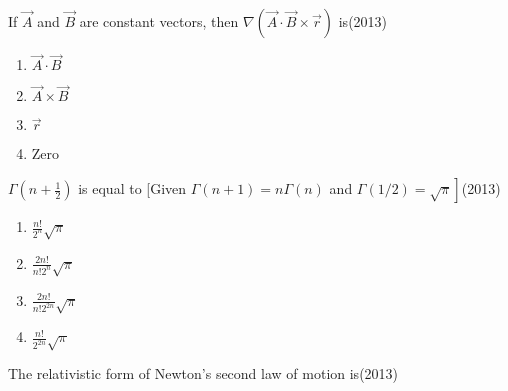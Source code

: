 
\iffalse
\chapter{2013}
\author{Prajwal naik}
\section{ph}
\fi








    \item If $\vec{A}$ and $\vec{B}$ are constant vectors, then $\nabla(\vec{A} \cdot \vec{B} \times \vec{r})$ is\hfill{(2013)}
   
   \begin{multicols}{4}
			\begin{enumerate}

\item $\vec{A} \cdot \vec{B}$
\item  $\vec{A} \times \vec{B}$
\item $\vec{r}$

\item Zero

        \end{enumerate}
		\end{multicols}
  \item  $\Gamma(n+\frac{1}{2})$ is equal to [Given $\Gamma(n+1)=n \Gamma(n)$ and $\left.\Gamma(1 / 2)=\sqrt{\pi}\right]$\hfill{(2013)}

   \begin{multicols}{4}
			\begin{enumerate}
\item  $\frac{n!}{2^{n}} \sqrt{\pi}$
\item $\frac{2 n!}{n!2^{n}} \sqrt{\pi}$
\item $\frac{2 n!}{n!2^{2 n}} \sqrt{\pi}$
\item $\frac{n!}{2^{2 n}} \sqrt{\pi}$

  \end{enumerate}
		\end{multicols}
  
  \item The relativistic form of Newton's second law of motion is\hfill{(2013)}

